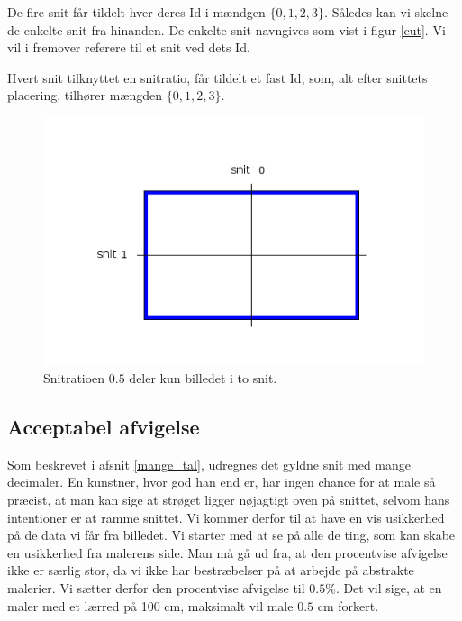 {De fire snit får tildelt hver deres Id i mændgen $\{0,1,2,3\}$. Således
kan vi skelne de enkelte snit fra hinanden. De enkelte snit navngives
som vist i figur \ref{cut}. Vi vil i fremover referere til et snit ved
dets Id.

\begin{definition}
    Hvert snit tilknyttet en snitratio, får tildelt et fast Id, som, alt
    efter snittets placering, tilhører mængden $\{0,1,2,3\}$.
\end{definition}

\begin{figure}[h]
    \centering
    \includegraphics[scale=0.42,angle=0]{afsnit/vores_implementation/billeder/naiv_algoritme/2Cut}
    \caption[]{Snitratioen $0.5$ deler kun billedet i to snit.}
    \label{2Cut}
\end{figure}

\subsection{Acceptabel afvigelse}
Som beskrevet i afsnit \ref{mange_tal}, udregnes det gyldne snit med
mange decimaler. En kunstner, hvor god han end er, har ingen chance for
at male så præcist, at man kan sige at strøget ligger nøjagtigt oven på
snittet, selvom hans intentioner er at ramme snittet. Vi kommer derfor
til at have en vis usikkerhed på de data vi får fra billedet. Vi starter
med at se på alle de ting, som kan skabe en usikkerhed fra malerens
side. Man må gå ud fra, at den procentvise afvigelse ikke er særlig
stor, da vi ikke har bestræbelser på at arbejde på abstrakte malerier.
Vi sætter derfor den procentvise afvigelse til $0.5 \%$. Det vil sige,
at en maler med et lærred på 100 cm, maksimalt vil male $0.5$ cm
forkert.

}

